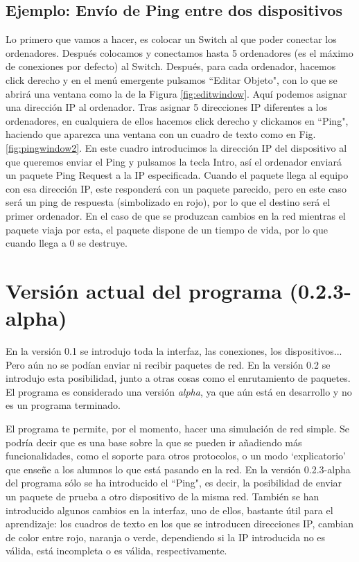 \documentclass[a4paper, 11pt]{report} %
\begin{document}
\subsection{Ejemplo: Envío de Ping entre dos dispositivos}
Lo primero que vamos a hacer, es colocar un Switch al que poder conectar los ordenadores. Después colocamos y conectamos hasta 5 ordenadores (es el máximo de conexiones por defecto) al Switch. Después, para cada ordenador, hacemos click derecho y en el menú emergente pulsamos ``Editar Objeto", con lo que se abrirá una ventana como la de la Figura \ref{fig:editwindow}. Aquí podemos asignar una dirección IP al ordenador. Tras asignar 5 direcciones IP diferentes a los ordenadores, en cualquiera de ellos hacemos click derecho y clickamos en ``Ping", haciendo que aparezca una ventana con un cuadro de texto como en Fig. \ref{fig:pingwindow2}. En este cuadro introducimos la dirección IP del dispositivo al que queremos enviar el Ping y pulsamos la tecla Intro, así el ordenador enviará un paquete Ping Request a la IP especificada. Cuando el paquete llega al equipo con esa dirección IP, este responderá con un paquete parecido, pero en este caso será un ping de respuesta (simbolizado en rojo), por lo que el destino será el primer ordenador. En el caso de que se produzcan cambios en la red mientras el paquete viaja por esta, el paquete dispone de un tiempo de vida, por lo que cuando llega a 0 se destruye.

\section{Versión actual del programa (0.2.3-alpha)}
\label{01}
En la versión 0.1 se introdujo toda la interfaz, las conexiones, los dispositivos... Pero aún no se podían enviar ni recibir paquetes de red. En la versión 0.2 se introdujo esta posibilidad, junto a otras cosas como el enrutamiento de paquetes. El programa es considerado una versión \textit{alpha}, ya que aún está en desarrollo y no es un programa terminado.

El programa te permite, por el momento, hacer una simulación de red simple. Se podría decir que es una base sobre la que se pueden ir añadiendo más funcionalidades, como el soporte para otros protocolos, o un modo `explicatorio' que enseñe a los alumnos lo que está pasando en la red. En la versión 0.2.3-alpha del programa sólo se ha introducido el ``Ping", es decir, la posibilidad de enviar un paquete de prueba a otro dispositivo de la misma red. También se han introducido algunos cambios en la interfaz, uno de ellos, bastante útil para el aprendizaje: los cuadros de texto en los que se introducen direcciones IP, cambian de color entre rojo, naranja o verde, dependiendo si la IP introducida no es válida, está incompleta o es válida, respectivamente.
\end{document}
